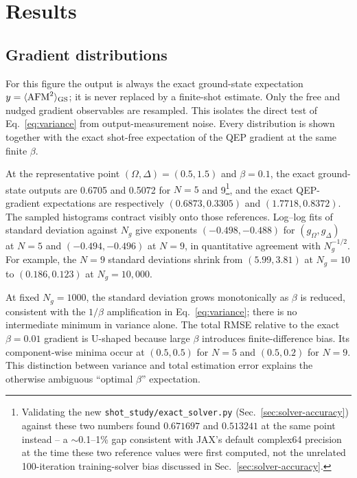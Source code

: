 \documentclass[11pt]{article}
\begin{document}
\section{Results}

\subsection{Gradient distributions}

For this figure the output is always the exact ground-state expectation
$y=\langle\mathrm{AFM}^2\rangle_{\rm GS}$; it is never replaced by a finite-shot
estimate.  Only the free and nudged gradient observables are resampled.  This isolates
the direct test of Eq.~\eqref{eq:variance} from output-measurement noise.  Every
distribution is shown together with the exact shot-free expectation of the QEP
gradient at the same finite $\beta$.


At the representative point $(\Omega,\Delta)=(0.5,1.5)$ and $\beta=0.1$, the exact
ground-state outputs are 0.6705 and 0.5072 for $N=5$ and
9\footnote{Validating the new \texttt{shot\_study/exact\_solver.py}
(Sec.~\ref{sec:solver-accuracy}) against these two numbers found
$0.671697$ and $0.513241$ at the same point instead -- a $\sim$0.1--1\% gap consistent
with JAX's default complex64 precision at the time these two reference values were
first computed, not the unrelated 100-iteration training-solver bias discussed in
Sec.~\ref{sec:solver-accuracy}.}, and the exact QEP-gradient
expectations are respectively $(0.6873,0.3305)$ and $(1.7718,0.8372)$.  The sampled
histograms contract visibly onto those references.  Log--log fits of standard deviation
against $N_g$ give exponents $(-0.498,-0.488)$ for $(g_\Omega,g_\Delta)$ at $N=5$ and
$(-0.494,-0.496)$ at $N=9$, in quantitative agreement with $N_g^{-1/2}$.  For example,
the $N=9$ standard deviations shrink from $(5.99,3.81)$ at $N_g=10$ to
$(0.186,0.123)$ at $N_g=10{,}000$.

At fixed $N_g=1000$, the standard deviation grows monotonically as $\beta$ is reduced,
consistent with the $1/\beta$ amplification in Eq.~\eqref{eq:variance}; there is no
intermediate minimum in variance alone.  The total RMSE relative to the exact
$\beta=0.01$ gradient is U-shaped because large $\beta$ introduces finite-difference
bias.  Its component-wise minima occur at $(0.5,0.5)$ for $N=5$ and $(0.5,0.2)$ for
$N=9$.  This distinction between variance and total estimation error explains the
otherwise ambiguous ``optimal $\beta$'' expectation.
\end{document}
